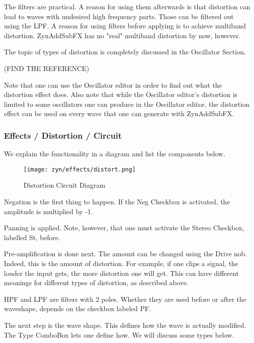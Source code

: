   The filters are practical. A reason for using them afterwards is that
   distortion can lead to waves with undesired high frequency parts. Those
   can be filtered out using the LPF. A reason for using filters before
   applying is to achieve multiband distortion. ZynAddSubFX has no "real"
   multiband distortion by now, however.

   The topic of types of distortion is completely discussed in the
   Oscillator Section.

   (FIND THE REFERENCE)

   Note that one can use the Oscillator editor in order
   to find out what the distortion effect does. Also note that while the
   Oscillator editor’s distortion is limited to some oscillators one can
   produce in the Oscillator editor, the distortion effect can be used on
   every wave that one can generate with ZynAddSubFX.

\subsubsection{Effects / Distortion / Circuit}
\label{subsubsec:effects_edit_distortion_circuit}

   We explain the functionality in a diagram and list the components below.

\begin{figure}[H]
   \centering 
   \texttt{[image: zyn/effects/distort.png]}
   \caption{Distortion Circuit Diagram}
   \label{fig:distortion_circuit_diagram}
\end{figure}

   Negation is the first thing to happen. If the Neg Checkbox is activated,
   the amplitude is multiplied by -1.

   Panning is applied. Note, however, that one must activate the Stereo
   Checkbox, labelled St, before.

   Pre-amplification is done next. The amount can be changed using the Drive
   nob. Indeed, this is the amount of distortion. For example, if one clips a
   signal, the louder the input gets, the more distortion one will get. This
   can have different meanings for different types of distortion, as
   described above.

   HPF and LPF are filters with 2 poles. Whether they are used before or
   after the waveshape, depends on the checkbox labeled PF.

   The next step is the wave shape. This defines how the wave is actually
   modified. The Type ComboBox lets one define how. We will discuss some
   types below.

